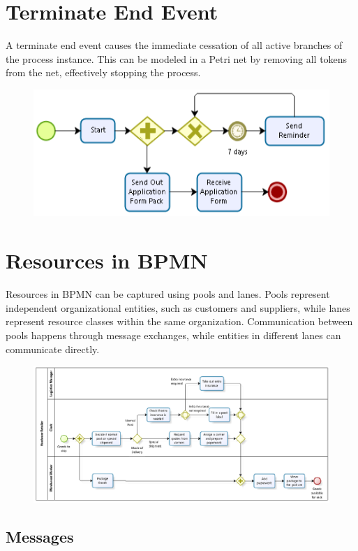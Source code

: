 \section{Terminate End Event}

A terminate end event causes the immediate cessation of all active branches of the process instance. This can be modeled in a Petri net by removing all tokens from the net, effectively stopping the process.
\begin{figure}[h!]
    \centering
    \includegraphics[width=0.75\linewidth]{capitolo 9/13.png}
\end{figure}

\section{Resources in BPMN}

Resources in BPMN can be captured using pools and lanes. Pools represent independent organizational entities, such as customers and suppliers, while lanes represent resource classes within the same organization. Communication between pools happens through message exchanges, while entities in different lanes can communicate directly.
\begin{figure}[h!]
    \centering
    \includegraphics[width=0.75\linewidth]{capitolo 9/14.png}
\end{figure}
\newpage
\subsection{Messages}

